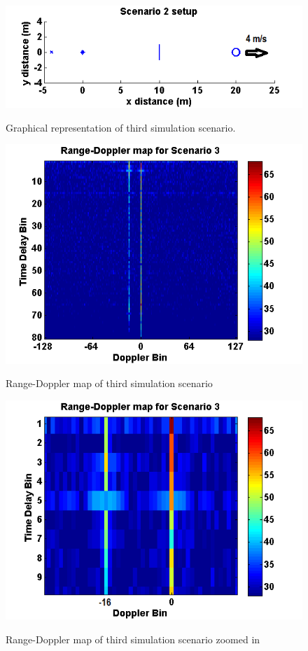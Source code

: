 \documentclass[article,11pt,onecolumn,final]{IEEEtran}
\begin{document}
\begin{figure}[H]
	\caption{Graphical representation of third simulation scenario.}
	\centering
	\includegraphics[width=400pt]{figures/sim2.png}
	\label{fig:sim2}
\end{figure}

\begin{figure}[H]
	\caption{Range-Doppler map of third simulation scenario}
	\centering
	\includegraphics[width=400pt]{figures/rdm3.png}
	\label{fig:rdm3}
\end{figure}

\begin{figure}[H]
	\caption{Range-Doppler map of third simulation scenario zoomed in}
	\centering
	\includegraphics[width=400pt]{figures/rdm3zoom.png}
	\label{fig:rdm3zoom}
\end{figure}
\end{document}
